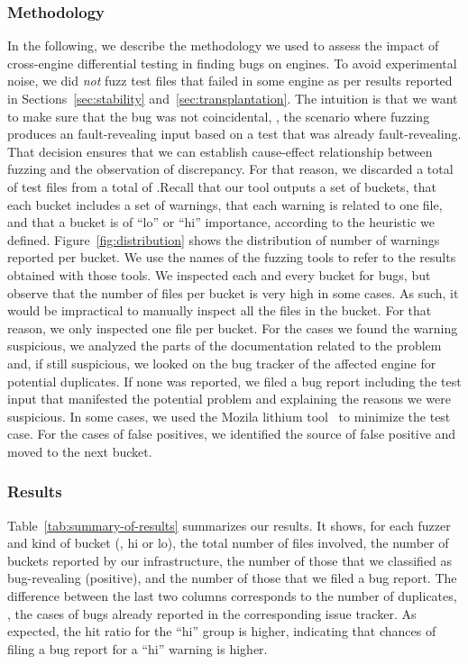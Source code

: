 \documentclass[10pt,conference,anonymous]{IEEEtran}
\begin{document}
\subsubsection{Methodology}
In the following, we describe the methodology we used to assess the
impact of cross-engine differential testing in finding bugs on \js{}
engines. To avoid experimental noise, we did \emph{not} fuzz test
files that failed in some engine as per results reported in
Sections~\ref{sec:stability} and~\ref{sec:transplantation}. The
intuition is that we want to make sure that the bug was not
coincidental, \ie{}, the scenario where fuzzing produces an
fault-revealing input based on a test that was already
fault-revealing. That decision ensures that we can establish
cause-effect relationship between fuzzing and the observation of
discrepancy. For that reason, we discarded a total of  test
files from a total of \totalTestFiles{}.Recall that our tool outputs a
set of buckets, that each bucket includes a set of warnings, that each
warning is related to one file, and that a bucket is of ``lo'' or
``hi'' importance, according to the heuristic we
defined. Figure~\ref{fig:distribution} shows the distribution of
number of warnings reported per bucket. We use the names of the
fuzzing tools to refer to the results obtained with those tools. We
inspected each and every bucket for bugs, but observe that the number
of files per bucket is very high in some cases. As such, it would be
impractical to manually inspect all the files in the bucket. For that
reason, we only inspected one file per bucket. For the cases we found
the warning suspicious, we analyzed the parts of the documentation
related to the problem and, if still suspicious, we looked on the bug
tracker of the affected engine for potential duplicates. If none was
reported, we filed a bug report including the test input that
manifested the potential problem and explaining the reasons we were
suspicious. In some cases, we used the Mozila lithium
tool~\cite{lithium} to minimize the test case. For the cases of false
positives, we identified the source of false positive and moved to the
next bucket.


\subsubsection{Results}
Table~\ref{tab:summary-of-results} summarizes our results. It shows,
for each fuzzer and kind of bucket (\ie{}, hi or lo), the total number
of files involved, the number of buckets reported by our
infrastructure, the number of those that we classified as
bug-revealing (positive), and the number of those that we filed a bug
report. The difference between the last two columns corresponds to the
number of duplicates, \ie{}, the cases of bugs already reported in the
corresponding issue tracker. As expected, the hit ratio for the ``hi''
group is higher, indicating that chances of filing a bug report for a
``hi'' warning is higher.
\end{document}
